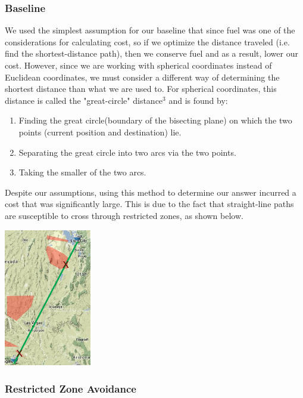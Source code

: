 \documentclass{article}[12pt]
\begin{document}
\begin{multicols}{2}
\subsubsection{Baseline}

We used the simplest assumption for our baseline that since fuel was one of the considerations for calculating cost, so if we optimize the distance traveled (i.e. find the shortest-distance path), then we conserve fuel and as a result, lower our cost. However, since we are working with spherical coordinates instead of Euclidean coordinates, we must consider a different way of determining the shortest distance than what we are used to. For spherical coordinates, this distance is called the "great-circle" distance$^3$ and is found by:\\

	\begin{enumerate}
		\item Finding the great circle(boundary of the bisecting plane) on which the two points (current position and destination) lie.
		\item Separating the great circle into two arcs via the two points. 
		\item Taking the smaller of the two arcs.\\
	\end{enumerate}

Despite our assumptions, using this method to determine our answer incurred a cost that was significantly large. This is due to the fact that straight-line paths are susceptible to cross through restricted zones, as shown below.

\begingroup
  \begin{center}
    \includegraphics[width=1.5in]{baseline.png}
	\end{center}
\endgroup

\subsubsection{Restricted Zone Avoidance}


\end{multicols}
\end{document}
